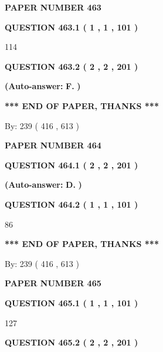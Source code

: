 \documentclass[12pt]{article}
\begin{document}
   
\newpage 
\setcounter{page}{ 
   463001 } 
   
   
 {\textbf{ \Large{ PAPER NUMBER  463  }}}
   
   
   
   
  
  
{\textbf{\large{QUESTION
463.1 
 ( 1 , 1 , 101 )
}}}

114
  
  
{\textbf{\large{QUESTION
463.2 
 ( 2 , 2 , 201 )
}}}
 
 
{\textbf{(Auto-answer:}}
{\textbf{\large{
F.}}}
{\textbf{)}}
 
 
   
   
   
   
\vspace{1.0in} 
{\textbf{\large{ *** END OF PAPER, THANKS *** }}} 
   
   
\hspace{1.0in} By: 
 239 ( 416 ,  613 )
   
   
   
   
\newpage 
\setcounter{page}{ 
   464001 } 
   
   
 {\textbf{ \Large{ PAPER NUMBER  464  }}}
   
   
   
   
  
  
{\textbf{\large{QUESTION
464.1 
 ( 2 , 2 , 201 )
}}}
 
 
{\textbf{(Auto-answer:}}
{\textbf{\large{
D.}}}
{\textbf{)}}
 
 
  
  
{\textbf{\large{QUESTION
464.2 
 ( 1 , 1 , 101 )
}}}

86
   
   
   
   
\vspace{1.0in} 
{\textbf{\large{ *** END OF PAPER, THANKS *** }}} 
   
   
\hspace{1.0in} By: 
 239 ( 416 ,  613 )
   
   
   
   
\newpage 
\setcounter{page}{ 
   465001 } 
   
   
 {\textbf{ \Large{ PAPER NUMBER  465  }}}
   
   
   
   
  
  
{\textbf{\large{QUESTION
465.1 
 ( 1 , 1 , 101 )
}}}

127
  
  
{\textbf{\large{QUESTION
465.2 
 ( 2 , 2 , 201 )
}}}
 
\end{document}
